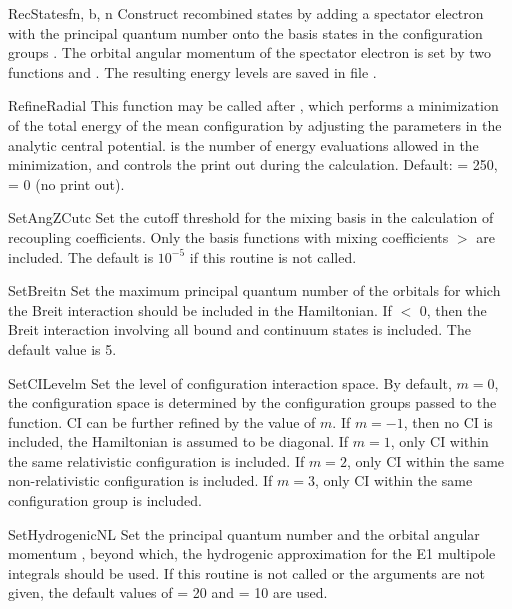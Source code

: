 \begin{fundesc}{RecStates}{fn, b, n}
Construct recombined states by adding a spectator electron with the principal
quantum number  onto the basis states in the configuration groups
. The orbital angular momentum of the spectator electron is set by two
functions  and . The resulting
energy levels are saved in file .
\end{fundesc}

\begin{fundesc}{RefineRadial}{}
This function may be called after , which performs a
minimization of the total energy of the mean configuration by adjusting the
parameters in the analytic central potential.  is the number of energy
evaluations allowed in the minimization, and  controls the print out
during the calculation. Default:  = 250,  = 0 (no print out).
\end{fundesc}

\begin{fundesc}{SetAngZCut}{c}
Set the cutoff threshold for the mixing basis in the calculation of recoupling
coefficients. Only the basis functions with mixing coefficients $>$ are
included. The default is $10^{-5}$ if this routine is not called.
\end{fundesc}

\begin{fundesc}{SetBreit}{n}
Set the maximum principal quantum number of the orbitals for which the
Breit interaction should be included in the Hamiltonian. If  $<$ 0,
then the Breit interaction involving all bound and continuum states is
included. The default value is 5.
\end{fundesc}

\begin{fundesc}{SetCILevel}{m}
Set the level of configuration interaction space. By default, $m=0$, the
configuration space is determined by the configuration groups passed to the
 function. CI can be further refined by the value of $m$. If
$m=-1$, then no CI is included, the Hamiltonian is assumed to be diagonal. If
$m=1$, only CI within the same relativistic configuration is included. If
$m=2$, only CI within the same non-relativistic configuration is included. If
$m=3$, only CI within the same configuration group is included.
\end{fundesc}

\begin{fundesc}{SetHydrogenicNL}{}
Set the principal quantum number  and the orbital angular momentum
, beyond which, the hydrogenic approximation for the E1 multipole
integrals should be used. If this routine is not called or the arguments are not
given, the default values of  = 20 and  = 10 are used.
\end{fundesc}

